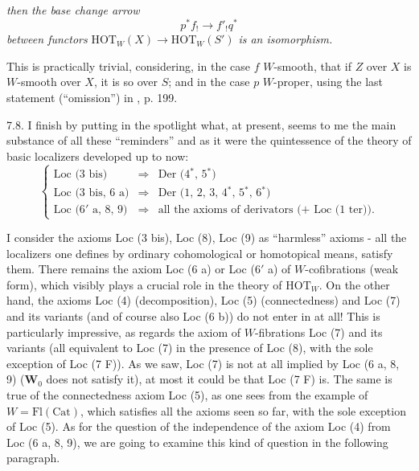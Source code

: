 

\textit{then the base change arrow}
\[ p^*f_!\longrightarrow f'_!q^* \]
\textit{between functors} $\mathrm{HOT}_W(X)\longrightarrow\mathrm{HOT}_W(S')$ \textit{is an isomorphism.}

This is practically trivial, considering, in the case $f$ $W$-smooth, that if $Z$ over $X$ is $W$-smooth over $X$, it is so over $S$; and in the case $p$ $W$-proper, using the last statement (``omission'') in , p. 199.

7.8. I finish by putting in the spotlight what, at present, seems to me the main substance of all these ``reminders'' and as it were the quintessence of the theory of basic localizers
developed up to now:
\[ \left\{ \begin{array}{rcl}
\text{Loc (3 bis)} & \Longrightarrow & \text{Der (4$^*$, 5$^*$)}\\[1ex]
\text{Loc (3 bis, 6 a)} & \Longrightarrow & \text{Der (1, 2, 3, 4$^*$, 5$^*$, 6$^*$)}\\[1ex]
\text{Loc (6$'$ a, 8, 9)} & \Longrightarrow & \text{all the axioms of derivators (+ Loc (1 ter)).}
\end{array} \right. \]

I consider the axioms Loc (3 bis), Loc (8), Loc (9) as ``harmless'' axioms - all the localizers one defines by ordinary cohomological or homotopical means, satisfy them. There remains the axiom Loc (6 a) or Loc (6$'$ a) of $W$-cofibrations (weak form),
which visibly plays a crucial role in the theory of $\mathrm{HOT}_W$. On the other hand, the axioms Loc (4) (decomposition), Loc (5) (connectedness) and Loc (7) and its variants (and of course also Loc (6 b)) do not enter in at all! This is particularly impressive, as regards the axiom of $W$-fibrations Loc (7) and its variants (all equivalent to Loc (7) in the presence of Loc (8), with the sole exception of Loc (7 F)). As we saw, Loc (7) is not at all implied by Loc (6 a, 8, 9) ($\mathbf{W}_0$ does not satisfy it), at most it could be that Loc (7 F) is. The same is true of the connectedness axiom Loc (5), as one sees from the example of $W=\mathrm{Fl}(\mathrm{Cat})$, which satisfies all the axioms seen so far, with the sole exception
of Loc (5). As for the question of the independence of the axiom Loc (4) from Loc (6 a, 8, 9), we are going to examine this kind of question in the following paragraph.


